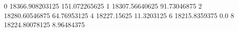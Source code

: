 0 18366.908203125 151.072265625
1 18307.56640625 91.73046875
2 18280.60546875 64.76953125
4 18227.15625 11.3203125
6 18215.8359375 0.0
8 18224.80078125 8.96484375
